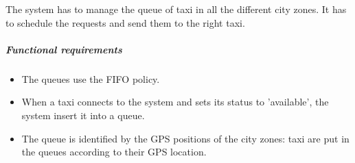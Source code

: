 The system has to manage the queue of taxi in all the different city zones. It has to schedule the requests and send them to the right taxi.
    
\subparagraph{Functional requirements}
\noindent
    \begin{itemize}
        \item The queues use the FIFO policy.
        \item When a taxi connects to the system and sets its status to 'available', the system insert it into a queue.
        \item The queue is identified by the GPS positions of the city zones: taxi are put in the queues according to their GPS location.
    \end{itemize}
